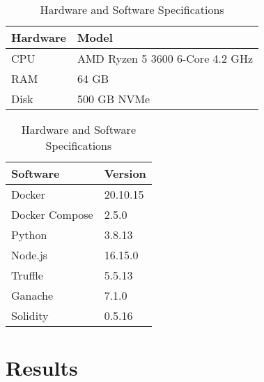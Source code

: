 \begin{table}[!h]
    \begin{subtable}[h]{0.59\textwidth}
        \centering
        \begin{tabular}{l|l} \hline \hline
            Hardware & Model                                    \\ \hline \hline
            CPU      & AMD Ryzen 5 3600 6-Core 4.2 GHz          \\ \hline
            RAM      & 64 GB                                    \\ \hline
            Disk     & 500 GB NVMe                              \\ \hline
        \end{tabular}
        \caption{Hardware}
        \label{evaluation:hardware}
    \end{subtable}
    \hfill
    \begin{subtable}[h]{0.39\textwidth}
        \centering
        \begin{tabular}{l|l} \hline \hline
            Software            & Version               \\ \hline \hline
            Docker              & 20.10.15              \\ \hline
            Docker Compose      & 2.5.0                 \\ \hline
            Python              & 3.8.13               \\ \hline
            Node.js             & 16.15.0               \\ \hline
            Truffle             & 5.5.13               \\ \hline
            Ganache             & 7.1.0               \\ \hline
            Solidity            & 0.5.16               \\ \hline
        \end{tabular}
        \caption{Software}
        \label{evaluation:software}
     \end{subtable}
     \caption{Hardware and Software Specifications}
     \label{tab:temps}
\end{table}

\section{Results}

% 